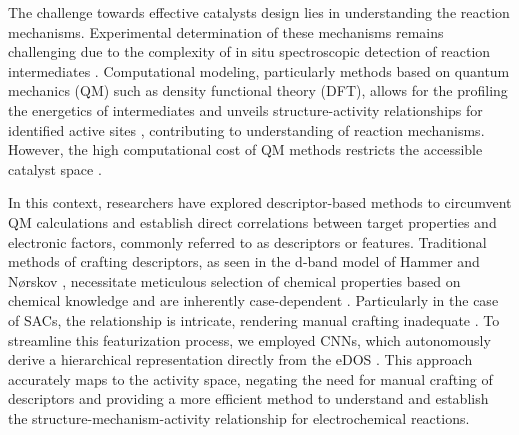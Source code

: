 \documentclass[a4paper, 12pt, titlepage]{article}
\begin{document}
    The challenge towards effective catalysts design lies in understanding the reaction mechanisms.
    Experimental determination of these mechanisms remains challenging due to
    the complexity of in situ spectroscopic detection of reaction intermediates \cite{zhao2021revisiting}.
    Computational modeling, particularly methods based on quantum mechanics (QM) such as density functional theory (DFT),
    allows for the profiling the energetics of intermediates and unveils structure-activity relationships
    for identified active sites \cite{feaster2017understanding, carter2008challenges},
    contributing to understanding of reaction mechanisms.
    However, the high computational cost of QM methods restricts the
    accessible catalyst space \cite{jinnouchi2017predicting, cuenya2015nanocatalysis, goldsmith2018machine}.

    In this context, researchers have explored descriptor-based methods
    to circumvent QM calculations and establish direct correlations
    between target properties and electronic factors, commonly referred to as descriptors or features.
    Traditional methods of crafting descriptors, as seen in the d-band model of Hammer and Nørskov \cite{hammer1995electronic},
    necessitate meticulous selection of chemical properties based on chemical knowledge
    and are inherently case-dependent \cite{kajita2017universal}.
    Particularly in the case of SACs, the relationship is intricate,
    rendering manual crafting inadequate \cite{han2021single, thirumalai2018investigating}.
    To streamline this featurization process, we employed CNNs,
    which autonomously derive a hierarchical representation directly from the eDOS
    \cite{tran2015learning, socher2012convolutional, krizhevsky2012imagenet}.
    This approach accurately maps to the activity space, negating the need for manual crafting of descriptors
    and providing a more efficient method to understand and
    establish the structure-mechanism-activity relationship for electrochemical reactions.
\end{document}
